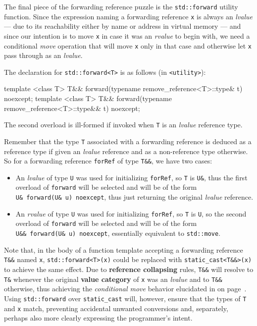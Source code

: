 The final piece of the forwarding reference puzzle is the
\texttt{std::forward} utility function. Since the expression naming a
forwarding reference \texttt{x} is always an \emph{lvalue} --- due to its
reachability either by name or address in virtual memory --- and since our
intention is to move \texttt{x} in case it was an \emph{rvalue} to begin
with, we need a conditional \emph{move} operation that will move
\texttt{x} only in that case and otherwise let \texttt{x} pass through as
an \emph{lvalue}.

The declaration for \texttt{std::forward<T>} is as follows (in
\texttt{<utility>}):

\begin{emcppslisting}
template <class T> T&& forward(typename remove_reference<T>::type& t) noexcept;
template <class T> T&& forward(typename remove_reference<T>::type&& t) noexcept;
\end{emcppslisting}

\noindent The second overload is ill-formed if invoked when \texttt{T} is an
\emph{lvalue} reference type.

Remember that the type \texttt{T} associated with a forwarding reference
is deduced as a reference type if given an \emph{lvalue} reference and
as a non-reference type otherwise. So for a forwarding reference
\texttt{forRef} of type \texttt{T\&\&}, we have two cases:
\begin{itemize}
\item{An \emph{lvalue} of type \texttt{U} was used for initializing \texttt{forRef}, so \texttt{T} is \texttt{U\&}, thus the first overload of \texttt{forward} will be selected and will be of the form \texttt{U\&}~\texttt{forward(U\&}~\texttt{u)}~\texttt{noexcept}, thus just returning the original \emph{lvalue} reference.}
\item{An \emph{rvalue} of type \texttt{U} was used for initializing \texttt{forRef}, so \texttt{T} is \texttt{U}, so the second overload of \texttt{forward} will be selected and will be of the form \texttt{U\&\&}~\texttt{forward(U\&}~\texttt{u)}~\texttt{noexcept}, essentially equivalent to \texttt{std::move}.}
\end{itemize}
Note that, in the body of a function template accepting a forwarding
reference \texttt{T\&\&} named \texttt{x}, \texttt{std::forward<T>(x)}
could be replaced with \texttt{static\_cast<T\&\&>(x)} to achieve the
same effect. Due to \textbf{reference collapsing} rules, \texttt{T\&\&}
will resolve to \texttt{T\&} whenever the original \textbf{value
category} of \texttt{x} was an \emph{lvalue} and to \texttt{T\&\&}
otherwise, thus achieving the \emph{conditional move} behavior
elucidated in \textit{} on page~\pageref{description-forwardingref}. Using \texttt{std::forward} over \texttt{static\_cast}
will, however, ensure that the types of \texttt{T} and \texttt{x} match,
preventing accidental unwanted conversions and, separately, perhaps also
more clearly expressing the programmer's intent.

